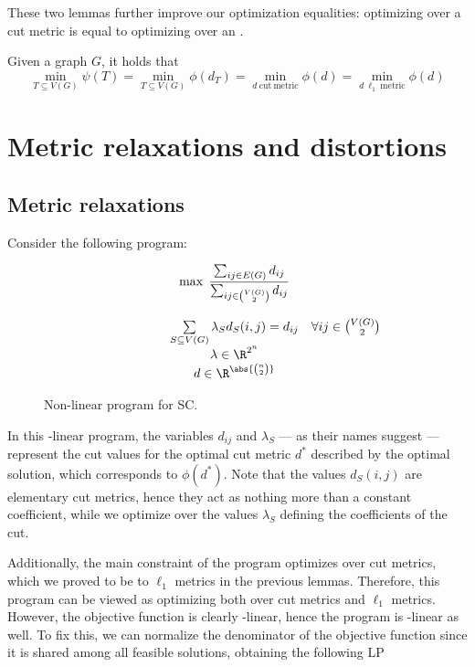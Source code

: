 \documentclass[a4paper, 12pt]{report}
\begin{document}
    These two lemmas further improve our optimization equalities: optimizing over a cut metric is equal to optimizing over an .

    \begin{framedcor}[label={metric cor}]{}
        Given a graph $G$, it holds that $$\min_{T \subseteq V(G)}{\psi(T)} = \min_{T \subseteq V(G)}{\phi(d_T)} = \min_{d \ \mathrm{cut \ metric}}{\phi(d)} = \min_{d \ \ell_1 \ \mathrm{metric}}{\phi(d)}$$
    \end{framedcor}

    \section{Metric relaxations and distortions}

    \subsection{Metric relaxations}

    Consider the following program:

    \begin{figure}[H]
        \centering
        \[\begin{array}{ccl}
            \qquad\qquad\quad
            & \max \; \dfrac{\sum_{ij \in E(G)}{d_{ij}}}{\sum_{ij \in \binom{V(G)}{2}}{d_{ij}}} \\\\
            & \sum\limits_{S \subseteq V(G)}{\lambda_Sd_S(i, j)}  = d_{ij} & \forall ij \in \binom{V(G)}{2} \\
            & \lambda \in \R^{2^n} \\
            & d \in \R^{\abs{\binom{n}{2}}} \\
        \end{array}\]
        \caption{Non-linear program for SC.}
    \end{figure}

    In this -linear program, the variables $d_{ij}$ and $\lambda_S$ --- as their names suggest --- represent the cut values for the optimal cut metric $d^*$ described by the optimal solution, which corresponds to $\phi(d^*)$. Note that the values $d_S(i,j)$ are elementary cut metrics, hence they act as nothing more than a constant coefficient, while we optimize over the values $\lambda_S$ defining the  coefficients of the cut.

    Additionally, the main constraint of the program optimizes over cut metrics, which we proved to be  to $\ell_1$ metrics in the previous lemmas. Therefore, this program can be viewed as optimizing both over cut metrics and $\ell_1$ metrics. However, the objective function is clearly -linear, hence the program is -linear as well. To fix this, we can normalize the denominator of the objective function since it is shared among all feasible solutions, obtaining the following LP
\end{document}
